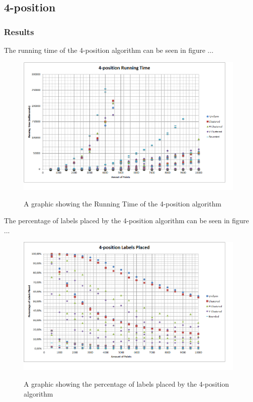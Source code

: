 \documentclass[crop=false,a4paper,oneside,11pt]{standalone}
\begin{document}
\subsection{4-position}
\subsubsection{Results}
The running time of the 4-position algorithm can be seen in figure ...
 \begin{figure}[h!]
 \centering
 \includegraphics[scale = 0.5]{4PosRunningTime.png}\\
 \caption{A graphic showing the Running Time of the 4-position algorithm}
 \end{figure}

The percentage of labels placed by the 4-position algorithm can be seen in figure ...
 \begin{figure}[h!]
 \centering
  \includegraphics[scale = 0.5]{4PosLabelsPlaced.png}\\
  \caption{A graphic showing the percentage of labels placed by the 4-position algorithm}
 \end{figure}
\end{document}
